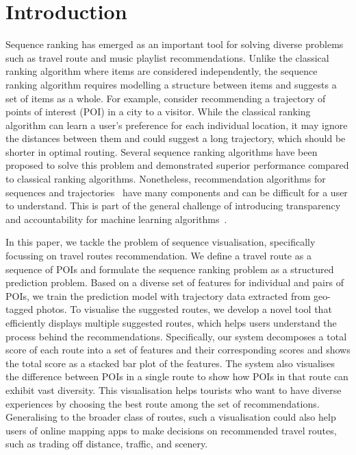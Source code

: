 
\section{Introduction}
Sequence ranking has emerged as an important tool for solving diverse problems such as travel route and music playlist recommendations. 
Unlike the classical ranking algorithm where items are considered independently, the sequence ranking algorithm requires modelling a structure between items and suggests a set of items as a whole. 
For example, consider recommending a trajectory of points of interest (POI) in a city to a visitor. 
While the classical ranking algorithm can learn a user's preference for each individual location, it may ignore the distances between them and could suggest a long trajectory, which should be shorter in optimal routing. 
Several sequence ranking algorithms have been proposed to solve this problem and demonstrated superior performance compared to classical ranking algorithms. 
Nonetheless, recommendation algorithms for sequences and trajectories~\cite{chen2016learning,chen2017SR} have many components and can be difficult for a user to understand. This is part of the general challenge of introducing transparency and accountability for machine learning algorithms~\cite{fatml}. 

In this paper, we tackle the problem of sequence visualisation, specifically focussing on travel routes recommendation. 
We define a travel route as a sequence of POIs and formulate the sequence ranking problem as a structured prediction problem. 
Based on a diverse set of features for individual and pairs of POIs, we train the prediction model with trajectory data extracted from geo-tagged photos. 
To visualise the suggested routes, we develop a novel tool that efficiently displays multiple suggested routes, which helps users understand the process behind the recommendations.
Specifically, our system decomposes a total score of each route into a set of features and their corresponding scores and shows the total score as a stacked bar plot of the features.
The system also visualises the difference between POIs in a single route to show how POIs in that route can exhibit vast diversity. 
This visualisation helps tourists who want to have diverse experiences by choosing the best route among the set of recommendations. Generalising to the broader class of routes, such a visualisation could also help users of online mapping apps to make decisions on recommended travel routes, such as trading off distance, traffic, and scenery. 
